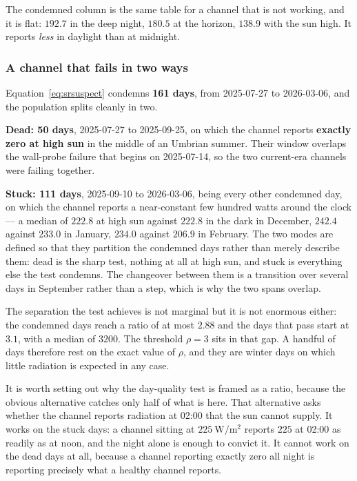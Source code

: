 \documentclass[11pt,a4paper]{article}
\begin{document}
The condemned column is the same table for a channel that is not working, and it is flat: $192.7$ in the deep night, $180.5$ at the horizon, $138.9$ with the sun high. It reports \emph{less} in daylight than at midnight.

\subsubsection*{A channel that fails in two ways}
\label{sec:sr_defect}

Equation~\eqref{eq:srsuspect} condemns \textbf{161 days}, from 2025-07-27 to 2026-03-06, and the population splits cleanly in two.

\textbf{Dead: 50 days}, 2025-07-27 to 2025-09-25, on which the channel reports \textbf{exactly zero at high sun} in the middle of an Umbrian summer. Their window overlaps the wall-probe failure that begins on 2025-07-14, so the two current-era channels were failing together.

\textbf{Stuck: 111 days}, 2025-09-10 to 2026-03-06, being every other condemned day, on which the channel reports a near-constant few hundred watts around the clock --- a median of $222.8$ at high sun against $222.8$ in the dark in December, $242.4$ against $233.0$ in January, $234.0$ against $206.9$ in February. The two modes are defined so that they partition the condemned days rather than merely describe them: dead is the sharp test, nothing at all at high sun, and stuck is everything else the test condemns. The changeover between them is a transition over several days in September rather than a step, which is why the two spans overlap.

The separation the test achieves is not marginal but it is not enormous either: the condemned days reach a ratio of at most $2.88$ and the days that pass start at $3.1$, with a median of $3200$. The threshold $\rho = 3$ sits in that gap. A handful of days therefore rest on the exact value of $\rho$, and they are winter days on which little radiation is expected in any case.

It is worth setting out why the day-quality test is framed as a ratio, because the obvious alternative catches only half of what is here. That alternative asks whether the channel reports radiation at 02:00 that the sun cannot supply. It works on the stuck days: a channel sitting at $225\ \mathrm{W/m^2}$ reports $225$ at 02:00 as readily as at noon, and the night alone is enough to convict it. It cannot work on the dead days at all, because a channel reporting exactly zero all night is reporting precisely what a healthy channel reports.
\end{document}
